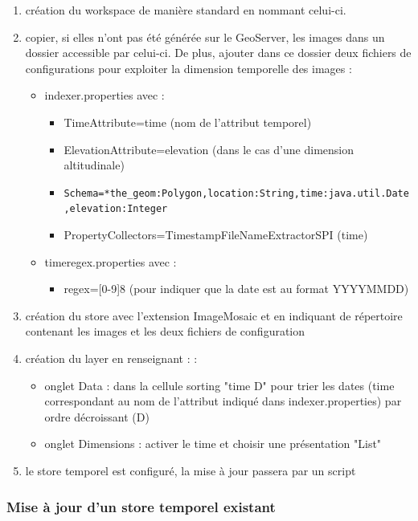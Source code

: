 \documentclass[10pt,a4paper]{article}
\begin{document}
\begin{enumerate}
\item création du workspace de manière standard en nommant celui-ci.
\item copier, si elles n'ont pas été générée sur le GeoServer, les images dans un dossier accessible par celui-ci. De plus, ajouter dans ce dossier deux fichiers de configurations pour exploiter la dimension temporelle des images :
\begin{itemize}
\item indexer.properties avec :
\begin{itemize}
\item TimeAttribute=time (nom de l'attribut temporel)
\item ElevationAttribute=elevation (dans le cas d'une dimension altitudinale)
\item \verb!Schema=*the_geom:Polygon,location:String,!\newline \verb!time:java.util.Date,elevation:Integer!
\item PropertyCollectors=TimestampFileNameExtractorSPI \newline [timeregex](time)
\end{itemize}
\item timeregex.properties avec :
\begin{itemize}
\item regex=[0-9]{8} (pour indiquer que la date est au format YYYYMMDD)
\end{itemize}
\end{itemize}
\item création du store avec l'extension ImageMosaic et en indiquant de répertoire contenant les images et les deux fichiers de configuration
\item création du layer en renseignant :  :
\begin{itemize}
\item onglet Data : dans la cellule sorting "time D" pour trier les dates (time correspondant au nom de l'attribut indiqué dans indexer.properties) par ordre décroissant (D)
\item onglet Dimensions : activer le time et choisir une présentation "List"
\end{itemize}
\item le store temporel est configuré, la mise à jour passera par un script
\end{enumerate}

\subsubsection{Mise à jour d'un store temporel existant}
\end{document}
